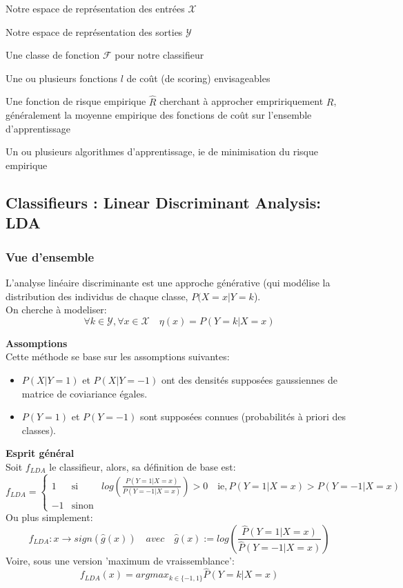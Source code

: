 \documentclass[a4paper]{article}
\theoremstyle{plain}
\begin{document}
\begin{outline}

\1 Notre espace de représentation des entrées $\mathcal{X}$

\1 Notre espace de représentation des sorties $\mathcal{Y}$

\1 Une classe de fonction $\mathcal{F}$ pour notre classifieur

\1 Une ou plusieurs fonctions $l$ de coût (de scoring) envisageables

\1 Une fonction de risque empirique $\hat R$ cherchant à approcher empririquement $R$, généralement la moyenne empirique des fonctions de coût sur l'ensemble d'apprentissage

\1 Un ou plusieurs algorithmes d'apprentissage, ie de minimisation du risque empirique

\end{outline}

\pagebreak
\subsection{Classifieurs : Linear Discriminant Analysis: LDA}

\subsubsection{Vue d'ensemble}

L'analyse linéaire discriminante est une approche générative (qui modélise la distribution des individus de chaque classe, $P(X=x|Y=k$).\\

On cherche à modeliser:
$$\forall k \in \mathcal{Y}, \forall x \in \mathcal{X} \quad \eta(x)=P(Y=k|X=x)$$


\textbf{Assomptions}\\
Cette méthode se base sur les assomptions suivantes:
\begin{itemize}
\item $P(X|Y=1)$ et $P(X|Y=-1)$ ont des densités supposées gaussiennes de matrice de coviariance égales.
\item $P(Y=1)$ et $P(Y=-1)$ sont supposées connues (probabilités à priori des classes).
\end{itemize}


\textbf{Esprit général}\\

Soit $f_{LDA}$ le classifieur, alors, sa définition de base est:
\begin{equation}
f_{LDA}=
\left\lbrace
\begin{array}{ccc}
1  & \mbox{si} & log(\frac{P(Y=1|X=x)}{P(Y=-1|X=x)})>0 \quad \mbox{ie}, P(Y=1|X=x)>P(Y=-1|X=x)\\
-1 & \mbox{sinon}
\end{array}\right.
\end{equation}
Ou plus simplement:
$$f_{LDA} : x \rightarrow sign(\hat g(x)) \quad avec \quad \hat g(x):= log(\frac{\hat P(Y=1|X=x)}{\hat P(Y=-1|X=x)}) $$
Voire, sous une version 'maximum de vraissemblance':
$$f_{LDA}(x) = argmax_{k \in \{-1,1\}} \hat P(Y=k|X=x) $$
\end{document}
